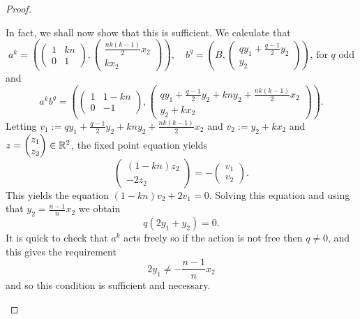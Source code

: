 \begin{proof}
\begin{case}[$A=A_4$, $B=B_2$]
        In fact, we shall now show that this is sufficient. We calculate that $$ a^k =
            \left(\begin{pmatrix}
                    1 & kn \\
                    0 & 1
                \end{pmatrix} , \begin{pmatrix}
                    \frac{nk(k-1)}{2}x_2 \\ kx_2
                \end{pmatrix}\right), \quad b^q =\left(B , \begin{pmatrix}
                    qy_1 + \frac{q-1}{2}y_2 \\ y_2
                \end{pmatrix}\right) \text{, for $q$ odd}
        $$
        and
        $$
            a^kb^q = \left(\begin{pmatrix}
                    1 & 1-kn \\
                    0 & -1
                \end{pmatrix} , \begin{pmatrix}
                    qy_1 + \frac{q-1}{2}y_2 + kny_2 + \frac{nk(k-1)}{2}x_2 \\ y_2 + kx_2
                \end{pmatrix}\right).
        $$
        Letting $v_1 := qy_1 + \frac{q-1}{2}y_2 + kny_2 + \frac{nk(k-1)}{2}x_2$ and $v_2 := y_2 + kx_2$ and $z = \begin{pmatrix}
                z_1 \\ z_2
            \end{pmatrix} \in \mathbb{R}^2$, the fixed point equation yields
        $$
            \begin{pmatrix}
                (1-kn)z_2 \\
                -2z_2
            \end{pmatrix} = - \begin{pmatrix}
                v_1 \\
                v_2
            \end{pmatrix}.
        $$
        This yields the equation $(1-kn)v_2 + 2v_1 = 0$. Solving this equation and using that $y_2 = \frac{n-1}{n}x_2$  we obtain
        $$
            q(2y_1 +y_2) =0.
        $$
        It is quick to check that $a^k$ acts freely so if the action is not free then $q \neq 0$, and this gives the requirement
        $$
            2y_1 \neq -\frac{n-1}{n}x_2
        $$
        and so this condition is sufficient and necessary.
    \end{case}
\end{proof}
